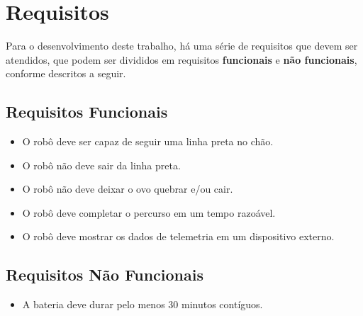 \section{Requisitos}

Para o desenvolvimento deste trabalho, há uma série de requisitos que devem ser
atendidos, que podem ser divididos em requisitos \textbf{funcionais} e
\textbf{não funcionais}, conforme descritos a seguir.

\subsection{Requisitos Funcionais}

\begin{itemize}
  \item O robô deve ser capaz de seguir uma linha preta no chão.
  \item O robô não deve sair da linha preta.
  \item O robô não deve deixar o ovo quebrar e/ou cair.
  \item O robô deve completar o percurso em um tempo razoável.
  \item O robô deve mostrar os dados de telemetria em um dispositivo externo.
\end{itemize}

\subsection{Requisitos Não Funcionais}

\begin{itemize}
  \item A bateria deve durar pelo menos 30 minutos contíguos.
\end{itemize}
